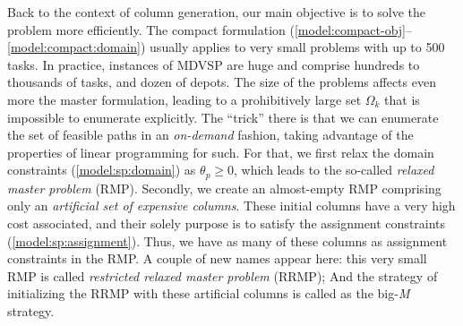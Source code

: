 \documentclass{article}
\begin{document}
Back to the context of column generation, our main objective is to solve the problem more efficiently. The compact formulation (\ref{model:compact-obj}--\ref{model:compact:domain}) usually applies to very small problems with up to 500 tasks. In practice, instances of MDVSP are huge and comprise hundreds to thousands of tasks, and dozen of depots. The size of the problems affects even more the master formulation, leading to a prohibitively large set $\Omega_k$ that is impossible to enumerate explicitly. The ``trick'' there is that we can enumerate the set of feasible paths in an \textit{on-demand} fashion, taking advantage of the properties of linear programming for such. For that, we first relax the domain constraints (\ref{model:sp:domain}) as $\theta_p \geqslant 0$, which leads to the so-called \textit{relaxed master problem} (RMP). Secondly, we create an almost-empty RMP comprising only an \textit{artificial set of expensive columns}. These initial columns have a very high cost associated, and their solely purpose is to satisfy the assignment constraints (\ref{model:sp:assignment}). Thus, we have as many of these columns as assignment constraints in the RMP. A couple of new names appear here: this very small RMP is called \textit{restricted relaxed master problem} (RRMP); And the strategy of initializing the RRMP with these artificial columns is called as the big-\textit{M} strategy.
\end{document}
